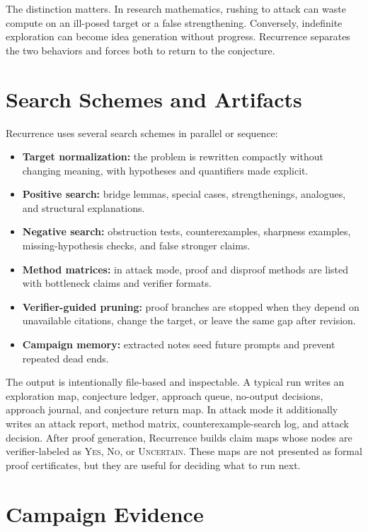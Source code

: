\documentclass{article}
\theoremstyle{definition}
\theoremstyle{remark}
\begin{document}
The distinction matters. In research mathematics, rushing to attack can waste compute on an ill-posed target or a false strengthening. Conversely, indefinite exploration can become idea generation without progress. Recurrence separates the two behaviors and forces both to return to the conjecture.

\section{Search Schemes and Artifacts}

Recurrence uses several search schemes in parallel or sequence:
\begin{itemize}
  \item \textbf{Target normalization:} the problem is rewritten compactly without changing meaning, with hypotheses and quantifiers made explicit.
  \item \textbf{Positive search:} bridge lemmas, special cases, strengthenings, analogues, and structural explanations.
  \item \textbf{Negative search:} obstruction tests, counterexamples, sharpness examples, missing-hypothesis checks, and false stronger claims.
  \item \textbf{Method matrices:} in attack mode, proof and disproof methods are listed with bottleneck claims and verifier formats.
  \item \textbf{Verifier-guided pruning:} proof branches are stopped when they depend on unavailable citations, change the target, or leave the same gap after revision.
  \item \textbf{Campaign memory:} extracted notes seed future prompts and prevent repeated dead ends.
\end{itemize}

The output is intentionally file-based and inspectable. A typical run writes an exploration map, conjecture ledger, approach queue, no-output decisions, approach journal, and conjecture return map. In attack mode it additionally writes an attack report, method matrix, counterexample-search log, and attack decision. After proof generation, Recurrence builds claim maps whose nodes are verifier-labeled as \textsc{Yes}, \textsc{No}, or \textsc{Uncertain}. These maps are not presented as formal proof certificates, but they are useful for deciding what to run next.

\section{Campaign Evidence}
\end{document}
